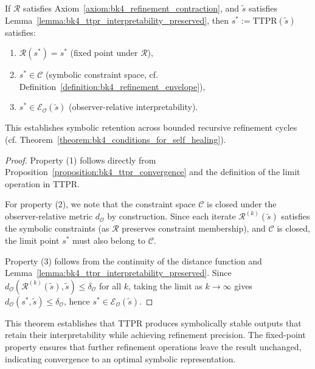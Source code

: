 \begin{theorem}
\label{theorem:bk4_ttpr_symbolic_stability}
If $\mathcal{R}$ satisfies Axiom~\ref{axiom:bk4_refinement_contraction}, and $\tilde{s}$ satisfies Lemma~\ref{lemma:bk4_ttpr_interpretability_preserved}, then $s^* := \mathrm{TTPR}(\tilde{s})$ satisfies:
\begin{enumerate}
    \item $\mathcal{R}(s^*) = s^*$ (fixed point under $\mathcal{R}$),
    \item $s^* \in \mathcal{C}$ (symbolic constraint space, cf. Definition~\ref{definition:bk4_refinement_envelope}),
    \item $s^* \in \mathcal{E}_{\mathcal{O}}(\tilde{s})$ (observer-relative interpretability).
\end{enumerate}
This establishes symbolic retention across bounded recursive refinement cycles (cf. Theorem~\ref{theorem:bk4_conditions_for_self_healing}).
\end{theorem}

\begin{proof}
\label{proof:bk4_symbolic_stability}
Property (1) follows directly from Proposition~\ref{proposition:bk4_ttpr_convergence} and the definition of the limit operation in TTPR.

For property (2), we note that the constraint space $\mathcal{C}$ is closed under the observer-relative metric $d_{\mathcal{O}}$ by construction. Since each iterate $\mathcal{R}^{(k)}(\tilde{s})$ satisfies the symbolic constraints (as $\mathcal{R}$ preserves constraint membership), and $\mathcal{C}$ is closed, the limit point $s^*$ must also belong to $\mathcal{C}$.

Property (3) follows from the continuity of the distance function and Lemma~\ref{lemma:bk4_ttpr_interpretability_preserved}. Since $d_{\mathcal{O}}(\mathcal{R}^{(k)}(\tilde{s}), \tilde{s}) \le \delta_{\mathcal{O}}$ for all $k$, taking the limit as $k \to \infty$ gives $d_{\mathcal{O}}(s^*, \tilde{s}) \le \delta_{\mathcal{O}}$, hence $s^* \in \mathcal{E}_{\mathcal{O}}(\tilde{s})$.
\end{proof}

This theorem establishes that TTPR produces symbolically stable outputs that retain their interpretability while achieving refinement precision. The fixed-point property ensures that further refinement operations leave the result unchanged, indicating convergence to an optimal symbolic representation.

